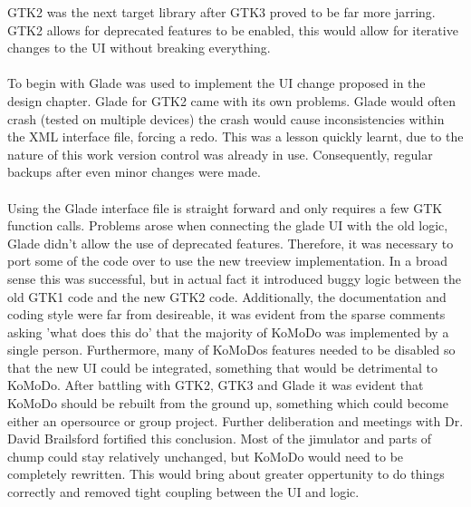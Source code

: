     GTK2 was the next target library after GTK3 proved to be far more jarring. GTK2 allows for deprecated features to be enabled, this would allow for iterative changes to the UI without breaking everything.\\\\
    To begin with Glade was used to implement the UI change proposed in the design chapter. Glade for GTK2 came with its own problems. Glade would often crash (tested on multiple devices) the crash would cause inconsistencies within the XML interface file, forcing a redo. This was a lesson quickly learnt, due to the nature of this work version control was already in use. Consequently, regular backups after even minor changes were made.\\\\
    Using the Glade interface file is straight forward and only requires a few GTK function calls. Problems arose when connecting the glade UI with the old logic, Glade didn't allow the use of deprecated features. Therefore, it was necessary to port some of the code over to use the new treeview implementation. In a broad sense this was successful, but in actual fact it introduced buggy logic between the old GTK1 code and the new GTK2 code. Additionally, the documentation and coding style were far from desireable, it was evident from the sparse comments asking 'what does this do' that the majority of KoMoDo was implemented by a single person. Furthermore, many of KoMoDos features needed to be disabled so that the new UI could be integrated, something that would be detrimental to KoMoDo.
    After battling with GTK2, GTK3 and Glade it was evident that KoMoDo should be rebuilt from the ground up, something which could become either an opersource or group project. Further deliberation and meetings with Dr. David Brailsford fortified this conclusion. Most of the jimulator and parts of chump could stay relatively unchanged, but KoMoDo would need to be completely rewritten. This would bring about greater oppertunity to do things correctly and removed tight coupling between the UI and logic.\\\\
